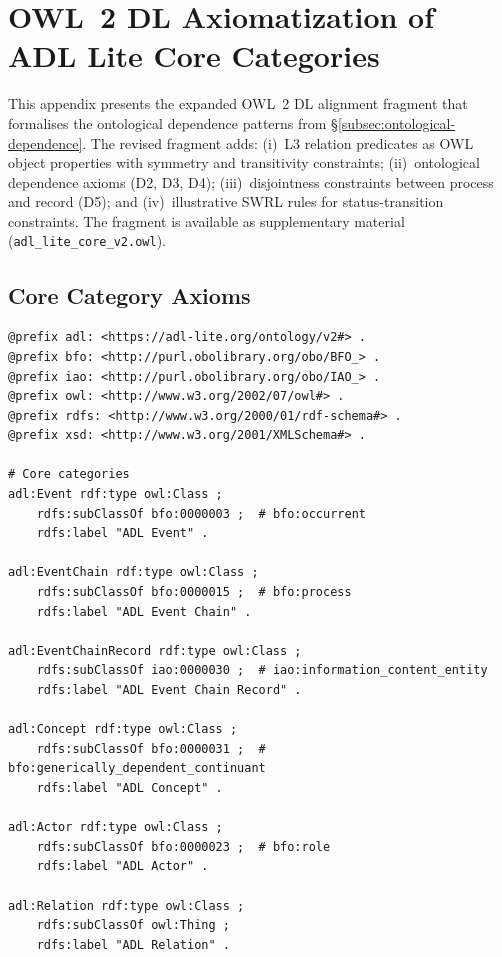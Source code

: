 \section{OWL~2 DL Axiomatization of ADL Lite Core Categories}\label{app:owl-dl}

This appendix presents the expanded OWL~2 DL alignment fragment that formalises the ontological dependence patterns from \S\ref{subsec:ontological-dependence}. The revised fragment adds: (i)~L3 relation predicates as OWL object properties with symmetry and transitivity constraints; (ii)~ontological dependence axioms (D2, D3, D4); (iii)~disjointness constraints between process and record (D5); and (iv)~illustrative SWRL rules for status-transition constraints. The fragment is available as supplementary material (\texttt{adl\_lite\_core\_v2.owl}).

\subsection{Core Category Axioms}

\begin{lstlisting}[language=turtle, caption={OWL~2 DL core categories.}, label={lst:owl-dl-core}]
@prefix adl: <https://adl-lite.org/ontology/v2#> .
@prefix bfo: <http://purl.obolibrary.org/obo/BFO_> .
@prefix iao: <http://purl.obolibrary.org/obo/IAO_> .
@prefix owl: <http://www.w3.org/2002/07/owl#> .
@prefix rdfs: <http://www.w3.org/2000/01/rdf-schema#> .
@prefix xsd: <http://www.w3.org/2001/XMLSchema#> .

# Core categories
adl:Event rdf:type owl:Class ;
    rdfs:subClassOf bfo:0000003 ;  # bfo:occurrent
    rdfs:label "ADL Event" .

adl:EventChain rdf:type owl:Class ;
    rdfs:subClassOf bfo:0000015 ;  # bfo:process
    rdfs:label "ADL Event Chain" .

adl:EventChainRecord rdf:type owl:Class ;
    rdfs:subClassOf iao:0000030 ;  # iao:information_content_entity
    rdfs:label "ADL Event Chain Record" .

adl:Concept rdf:type owl:Class ;
    rdfs:subClassOf bfo:0000031 ;  # bfo:generically_dependent_continuant
    rdfs:label "ADL Concept" .

adl:Actor rdf:type owl:Class ;
    rdfs:subClassOf bfo:0000023 ;  # bfo:role
    rdfs:label "ADL Actor" .

adl:Relation rdf:type owl:Class ;
    rdfs:subClassOf owl:Thing ;
    rdfs:label "ADL Relation" .
\end{lstlisting}

